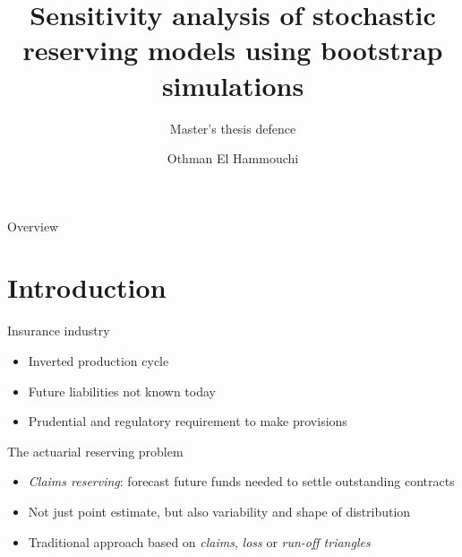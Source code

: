 \documentclass[tikz]{beamer}
\title{Sensitivity analysis of stochastic reserving models using bootstrap simulations}
\subtitle{Master's thesis defence}
\author{Othman El Hammouchi}
\begin{document}
\frame{\maketitle}

\begin{frame}{Overview}
  \tableofcontents
\end{frame}

\section{Introduction}

\begin{frame}{Insurance industry}
  \begin{itemize}
    \item Inverted production cycle
    \item Future liabilities not known today
    \item Prudential and regulatory requirement to make provisions
  \end{itemize}
\end{frame}

\begin{frame}{The actuarial reserving problem}
  \begin{itemize}
    \item \emph{Claims reserving}: forecast future funds needed to settle outstanding contracts
    \item Not just point estimate, but also variability and shape of distribution
    \item Traditional approach based on \emph{claims}, \emph{loss} or \emph{run-off triangles}
  \end{itemize}
\end{frame}
\end{document}
